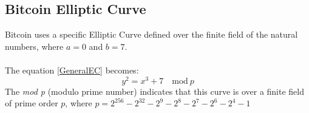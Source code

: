 \subsection{Bitcoin Elliptic Curve}
Bitcoin uses a specific Elliptic Curve defined over the finite field of the natural numbers, where $a=0$ and $b=7$. \\ \\
The equation \ref{GeneralEC} becomes:
\begin{equation}\label{BitcoinEC}
y^2=x^3+7 \quad \textrm{mod} \ p
\end{equation}
The \textit{mod p} (modulo prime number) indicates that this curve is over a finite field of prime order $p$, where $p=2^{256}-2^{32}-2^9-2^8-2^7-2^6-2^4-1$














